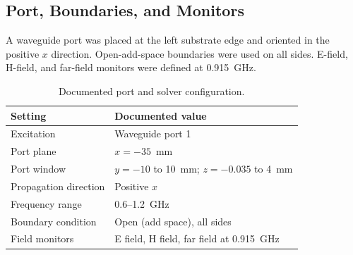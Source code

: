 \subsection{Port, Boundaries, and Monitors}

A waveguide port was placed at the left substrate edge and oriented in the positive
$x$ direction. Open-add-space boundaries were used on all sides. E-field, H-field,
and far-field monitors were defined at 0.915~GHz.

\begin{table}[H]
\centering
\caption{Documented port and solver configuration.}
\label{tab:solver-configuration}
\begin{tabular}{@{}ll@{}}
\toprule
\textbf{Setting} & \textbf{Documented value} \\
\midrule
Excitation & Waveguide port 1 \\
Port plane & $x=-35$~mm \\
Port window & $y=-10$ to 10~mm; $z=-0.035$ to 4~mm \\
Propagation direction & Positive $x$ \\
Frequency range & 0.6--1.2~GHz \\
Boundary condition & Open (add space), all sides \\
Field monitors & E field, H field, far field at 0.915~GHz \\
\bottomrule
\end{tabular}
\end{table}

